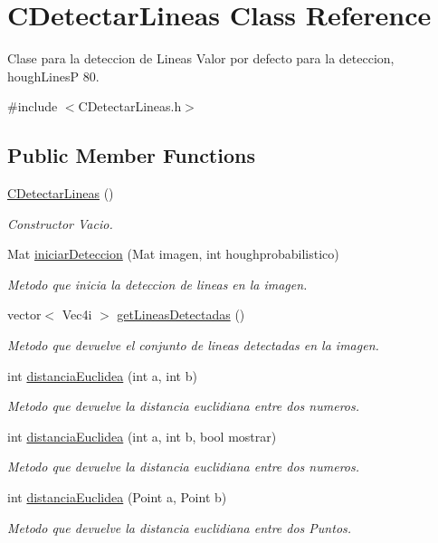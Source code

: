 \hypertarget{classCDetectarLineas}{}\section{C\+Detectar\+Lineas Class Reference}
\label{classCDetectarLineas}


Clase para la deteccion de Lineas Valor por defecto para la deteccion, hough\+LinesP 80.  




{\ttfamily \#include $<$C\+Detectar\+Lineas.\+h$>$}

\subsection*{Public Member Functions}
\begin{DoxyCompactItemize}
\item 
\hyperlink{classCDetectarLineas_a4a48d20f23a63a2a0202a316317e0801}{C\+Detectar\+Lineas} ()
\begin{DoxyCompactList}\small\item\em Constructor Vacio. \end{DoxyCompactList}\item 
Mat \hyperlink{classCDetectarLineas_a8380e777f5cac60aae54ac0cf13b7246}{iniciar\+Deteccion} (Mat imagen, int houghprobabilistico)
\begin{DoxyCompactList}\small\item\em Metodo que inicia la deteccion de lineas en la imagen. \end{DoxyCompactList}\item 
vector$<$ Vec4i $>$ \hyperlink{classCDetectarLineas_ad3c473d7e85a3c4901870af10ff9d5ed}{get\+Lineas\+Detectadas} ()
\begin{DoxyCompactList}\small\item\em Metodo que devuelve el conjunto de lineas detectadas en la imagen. \end{DoxyCompactList}\item 
int \hyperlink{classCDetectarLineas_ad7493ac0d73201a7c9188f8a283b6a88}{distancia\+Euclidea} (int a, int b)
\begin{DoxyCompactList}\small\item\em Metodo que devuelve la distancia euclidiana entre dos numeros. \end{DoxyCompactList}\item 
int \hyperlink{classCDetectarLineas_abe5bf1860071f33e7339742fd88e6e78}{distancia\+Euclidea} (int a, int b, bool mostrar)
\begin{DoxyCompactList}\small\item\em Metodo que devuelve la distancia euclidiana entre dos numeros. \end{DoxyCompactList}\item 
int \hyperlink{classCDetectarLineas_a88fe565263283487188f7c032a661d2f}{distancia\+Euclidea} (Point a, Point b)
\begin{DoxyCompactList}\small\item\em Metodo que devuelve la distancia euclidiana entre dos Puntos. \end{DoxyCompactList}\end{DoxyCompactItemize}
